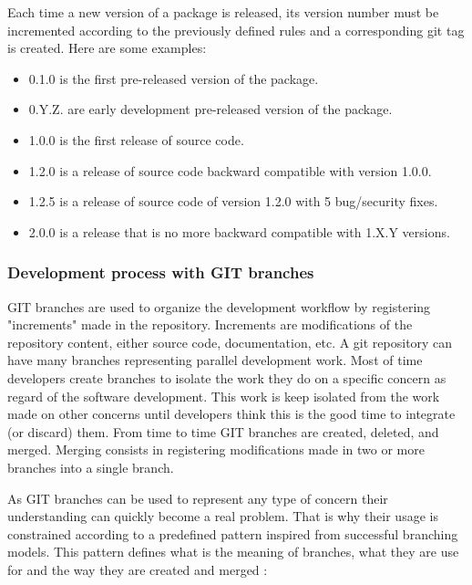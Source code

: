 \documentclass[12pt,a4paper]{article}
\begin{document}
Each time a new version of a package is released, its version number must be incremented according to the previously defined rules and a corresponding git tag is created. Here are some examples:
\begin{itemize}
\item 0.1.0 is the first pre-released version of the package.
\item 0.Y.Z. are early development pre-released version of the package.
\item 1.0.0 is the first release of source code.
\item 1.2.0  is a release of source code backward compatible with version 1.0.0.
\item 1.2.5 is a release of source code of version 1.2.0 with 5 bug/security fixes.
\item 2.0.0 is a release that is no more backward compatible with 1.X.Y versions.
\end{itemize}

\subsubsection{Development process with GIT branches}
\label{sec:gitbranches}

GIT branches are used to organize the development workflow by registering "increments" made in the repository. Increments are modifications of the repository content, either source code, documentation, etc. A git repository can have many branches representing parallel development work. Most of time developers create branches to isolate the work they do on a specific concern as regard of the software development. This work is keep isolated from the work made on other concerns until developers think this is the good time to integrate (or discard) them. From time to time GIT branches are created, deleted, and merged. Merging consists in registering modifications made in two or more branches into a single branch.

As GIT branches can be used to represent any type of concern their understanding can quickly become a real problem. That is why their usage is constrained according to a predefined pattern inspired from successful branching models. This pattern defines what is the meaning of branches, what they are use for and the way they are created and merged :
\end{document}
